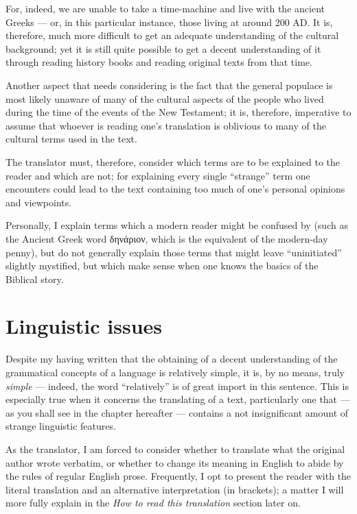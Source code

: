  For, indeed, we are unable to take a time-machine and live with the ancient Greeks — or, in this particular instance, those living at around 200 AD. It is, therefore, much more difficult to get an adequate understanding of the cultural background; yet it is still quite possible to get a decent understanding of it through reading history books and reading original texts from that time.
 
 Another aspect that needs considering is the fact that the general populace is most likely unaware of many of the cultural aspects of the people who lived during the time of the events of the New Testament; it is, therefore, imperative to assume that whoever is reading one's translation is oblivious to many of the cultural terms used in the text.  
 
 The translator must, therefore, consider which terms are to be explained to the reader and which are not; for explaining every single ``strange'' term one encounters could lead to the text containing too much of one's personal opinions and viewpoints. 
 
 Personally, I explain terms which a modern reader might be confused by (such as the Ancient Greek word δηνάριον, which is the equivalent of the modern-day penny), but do not generally explain those terms that might leave ``uninitiated'' slightly mystified, but which make sense when one knows the basics of the Biblical story.
 
 \section*{Linguistic issues}
  
Despite my having written that the obtaining of a decent understanding of the grammatical concepts of a language is relatively simple, it is, by no means, truly \textit{simple} — indeed, the word ``relatively'' is of great import in this sentence. This is especially true when it concerns the translating of a text, particularly one that — as you shall see in the chapter hereafter — contains a not insignificant amount of strange linguistic features. 

As the translator, I am forced to consider whether to translate what the original author wrote verbatim, or whether to change its meaning in English to abide by the rules of regular English prose. Frequently, I opt to present the reader with the literal translation and an alternative interpretation (in brackets); a matter I will more fully explain in the \textit{How to read this translation} section later on. 

